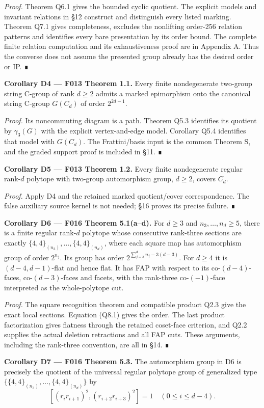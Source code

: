 \documentclass[
  10pt,
  letterpaper,
]{article}
\begin{document}
\emph{Proof.} Theorem Q6.1 gives the bounded cyclic quotient. The
explicit models and invariant relations in §12 construct and distinguish
every listed marking. Theorem Q7.1 gives completeness, excludes the
nonlifting order-256 relation patterns and identifies every bare
presentation by its order bound. The complete finite relation
computation and its exhaustiveness proof are in Appendix A. Thus the
converse does not assume the presented group already has the desired
order or IP. ∎

\textbf{Corollary D4 --- F013 Theorem 1.1.} Every finite nondegenerate
two-group string C-group of rank \(d\ge2\) admits a marked epimorphism
onto the canonical string C-group \(G(C_d)\) of order \(2^{2d-1}\).

\emph{Proof.} Its noncommuting diagram is a path. Theorem Q5.3
identifies its quotient by \(\gamma_3(G)\) with the explicit
vertex-and-edge model. Corollary Q5.4 identifies that model with
\(G(C_d)\). The Frattini/basis input is the common Theorem S, and the
graded support proof is included in §11. ∎

\textbf{Corollary D5 --- F013 Theorem 1.2.} Every finite nondegenerate
regular rank-\(d\) polytope with two-group automorphism group,
\(d\ge2\), covers \(C_d\).

\emph{Proof.} Apply D4 and the retained marked quotient/cover
correspondence. The false auxiliary source kernel is not needed; §16
proves its precise failure. ∎

\textbf{Corollary D6 --- F016 Theorem 5.1(a--d).} For \(d\ge3\) and
\(n_3,\ldots,n_d\ge5\), there is a finite regular rank-\(d\) polytope
whose consecutive rank-three sections are exactly
\(\{4,4\}_{(n_3)},\ldots,\{4,4\}_{(n_d)}\), where each square map has
automorphism group of order \(2^{n_j}\). Its group has order
\(2^{\sum_{j=3}^d n_j-3(d-3)}\). For \(d\ge4\) it is \((d-4,d-1)\)-flat
and hence flat. It has FAP with respect to its co-\((d-4)\)-faces,
co-\((d-3)\)-faces and facets, with the rank-three co-\((-1)\)-face
interpreted as the whole-polytope cut.

\emph{Proof.} The square recognition theorem and compatible product Q2.3
give the exact local sections. Equation (Q8.1) gives the order. The last
product factorization gives flatness through the retained coset-face
criterion, and Q2.2 supplies the actual deletion retractions and all FAP
cuts. These arguments, including the rank-three convention, are all in
§14. ∎

\textbf{Corollary D7 --- F016 Theorem 5.3.} The automorphism group in D6
is precisely the quotient of the universal regular polytope group of
generalized type \(\{\{4,4\}_{(n_3)},\ldots,\{4,4\}_{(n_d)}\}\) by \[
[(r_ir_{i+1})^2,(r_{i+2}r_{i+3})^2]=1
\quad(0\le i\le d-4).
\]
\end{document}
